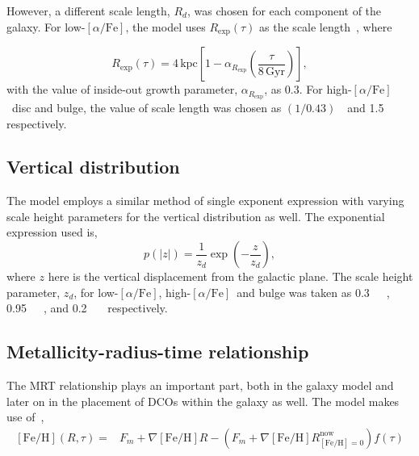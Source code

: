 \documentclass[12pt, journal, onecolumn]{IEEEtran}
\newcommand{\kpc}{\kilo\parsec}
\newcommand{\lowalpha}{low-$[\alpha/\text{Fe}]$}
\newcommand{\highalpha}{high-$[\alpha/\text{Fe}]$}
\newcommand{\feh}{[\text{Fe}/\text{H}]}
\begin{document}
    However, a different scale length, $R_d$, was chosen for each component of the galaxy.
    For \lowalpha, the model uses $R_\text{exp}(\tau)$ as the scale length~\cite[Eq 6]{Frankel2018}, where

    \begin{equation}%
        R_\text{exp}(\tau) = 4\,\text{kpc}\left[1 - \alpha_{R_\text{exp}}\left(\frac{\tau}{8\,\text{Gyr}}\right)\right],
        \label{eq:exponential_radius_equation}
    \end{equation}%
    with the value of inside-out growth parameter, $\alpha_{R_\text{exp}}$, as 0.3. For \highalpha\ disc and bulge, the value of scale length was chosen as $(1/0.43)\,$\si{\kpc} and \SI{1.5}{\kpc} respectively.

    \subsection{Vertical distribution}
    \label{subsec:vertical_distribution}
    The model employs a similar method of single exponent expression with varying scale height parameters for the vertical distribution as well.
    The exponential expression used is,
    \begin{equation}
        p(|z|) = \frac{1}{z_d}\exp\left(-\frac{z}{z_d}\right),
        \label{eq:vertical_distribution_of_stars}
    \end{equation}
    where $z$ here is the vertical displacement from the galactic plane.
    The scale height parameter, $z_d$, for \lowalpha, \highalpha\ and bulge was taken as \SI{0.3}{\kpc}~\cite{McMillan2011}, \SI{0.95}{\kpc}~\cite{Bovy2016}, and \SI{0.2}{\kpc}~\cite{Wegg2015} respectively.

    \subsection{Metallicity-radius-time relationship}
    \label{subsec:metallicity_radius_relationship}
    The MRT relationship plays an important part, both in the galaxy model and later on in the placement of DCOs within the galaxy as well.
    The model makes use of~\cite[Eq. 7]{Frankel2018},
    \begin{equation}
        \begin{aligned}
            \feh(R,\tau) = {} & F_m + \nabla\feh R - \left(F_m + \nabla\feh R_{\feh=0}^{\text{now}}\right) f(\tau)
        \end{aligned}
    \end{equation}
\end{document}
